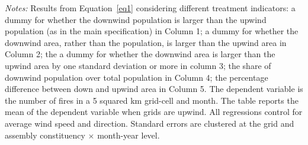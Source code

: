 \documentclass[12pt]{article}
\begin{document}
{%
 \begin{table}[htbp!]
     \centering
     \caption{Effect of constituency exposure to smoke on number of fires, robustness by treatment indicator \label{tab:main_by_treat}}
     \resizebox{0.8\textwidth}{!}{
      
      }
      \begin{minipage}{\textwidth}
         {\small \textit{Notes: }Results from Equation~\ref{eq1} considering different treatment indicators: a dummy for whether the downwind population is larger than the upwind population (as in the main specification) in Column 1; a dummy for whether the downwind area, rather than the population, is larger than the upwind area in Column 2; the a dummy for whether the downwind area is larger than the upwind area by one standard deviation or more in column 3; the share of downwind population over total population in Column 4; the percentage difference between down and upwind area in Column 5. The dependent variable is the number of fires in a 5 squared km grid-cell and month. 
         The table reports the mean of the dependent variable when grids are upwind. All regressions control for average wind speed and direction. Standard errors are clustered at the grid and assembly constituency $\times$ month-year level. }
     \end{minipage}
 \end{table}




 \begin{table}[htbp!]
     \centering
     \caption{Effect of constituency exposure to smoke on number of fires, robustness by treatment indicator \label{tab:main_by_treat}}
     \resizebox{0.8\textwidth}{!}{
      
      }

 \end{table}


 \begin{table}[htbp!]
     \centering
     \caption{Effect of constituency exposure to smoke on number of fires, robustness by treatment indicator \label{tab:main_by_treat}}
     \resizebox{0.8\textwidth}{!}{
      
      }
  
 \end{table}


}
\end{document}
